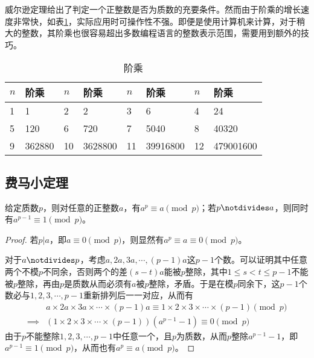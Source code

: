 威尔逊定理给出了判定一个正整数是否为质数的充要条件。然而由于阶乘的增长速度非常快，如表\ref{tab:factorial}，实际应用时可操作性不强。即便是使用计算机来计算，对于稍大的整数，其阶乘也很容易超出多数编程语言的整数表示范围，需要用到额外的技巧。
\begin{table}[htbp]
  \centering
  \caption{阶乘}
  \label{tab:factorial}
  \begin{tabular}{ll||ll||ll||ll}
    \hline
    $n$ & 阶乘    & $n$ & 阶乘    & $n$ & 阶乘     & $n$ & 阶乘 \\\hline
    1   & 1      & 2   & 2       & 3   & 6        & 4   & 24\\
    5   & 120    & 6   & 720     & 7   & 5040     & 8   & 40320\\
    9   & 362880 & 10  & 3628800 & 11  & 39916800 & 12  & 479001600\\
    \hline
  \end{tabular}
\end{table}


\subsection{费马小定理}
\label{sec:Fermat-little-theorem}

\begin{theorem}
  给定质数$p$，则对任意的正整数$a$，有$a^p\equiv a\pmod p$；若$p\notdivides a$，则同时有$a^{p-1}\equiv1\pmod p$。
\end{theorem}
\begin{proof}
  若$p|a$，即$a\equiv0\pmod p$，则显然有$a^p\equiv a\equiv0\pmod p$。

  对于$a\notdivides p$，考虑$a,2a,3a,\cdots,(p-1)a$这$p-1$个数。可以证明其中任意两个不模$p$不同余，否则两个的差$(s-t)a$能被$p$整除，其中$1\le s<t\le p-1$不能被$p$整除，再由$p$是质数从而必须有$a$被$p$整除，矛盾。于是在模$p$同余下，这$p-1$个数必与$1,2,3,\cdots,p-1$重新排列后一一对应，从而有
  \begin{align*}
    & a \times 2a \times 3a \times \cdots \times (p-1)a
    \equiv 1 \times 2 \times 3 \times \cdots \times (p-1) \pmod p\\
    \implies & (1\times 2\times 3\times\cdots\times (p-1))(a^{p-1}-1)\equiv0\pmod p
  \end{align*}
  由于$p$不能整除$1,2,3,\cdots,p-1$中任意一个，且$p$为质数，从而$p$整除$a^{p-1}-1$，即$a^{p-1}\equiv1\pmod p$，从而也有$a^p\equiv a\pmod p$。
\end{proof}

